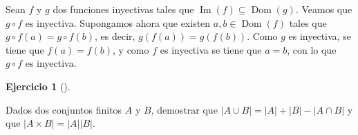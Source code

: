 \documentclass[
  spanish,
  a4paper,
]{scrreport}
\theoremstyle{definition}
\newtheorem{exercise}{Ejercicio}[chapter]
\theoremstyle{remark}
\begin{document}
\begin{tcolorbox}[enhanced jigsaw, arc=.35mm, bottomrule=.15mm, bottomtitle=1mm, breakable, colback=white, colbacktitle=quarto-callout-tip-color!10!white, colframe=quarto-callout-tip-color-frame, coltitle=black, left=2mm, leftrule=.75mm, opacityback=0, opacitybacktitle=0.6, rightrule=.15mm, title=\textcolor{quarto-callout-tip-color}{\faLightbulb}\hspace{0.5em}{Solución}, titlerule=0mm, toprule=.15mm, toptitle=1mm]

Sean \(f\) y \(g\) dos funciones inyectivas tales que
\(\operatorname{Im}(f)\subseteq\operatorname{Dom}(g)\). Veamos que
\(g\circ f\) es inyectiva. Supongamos ahora que existen
\(a, b\in \operatorname{Dom}(f)\) tales que \(g\circ f(a)=g\circ f(b)\),
es decir, \(g(f(a))=g(f(b))\). Como \(g\) es inyectiva, se tiene que
\(f(a)=f(b)\), y como \(f\) es inyectiva se tiene que \(a=b\), con lo
que \(g\circ f\) es inyectiva.

\end{tcolorbox}

\begin{exercise}[]\protect\hypertarget{exr-cardinal-union-producto-cartesiano}{}\label{exr-cardinal-union-producto-cartesiano}

Dados dos conjuntos finitos \(A\) y \(B\), demostrar que
\(|A\cup B| = |A|+|B|-|A\cap B|\) y que \(|A\times B|=|A||B|\).

\end{exercise}
\end{document}
